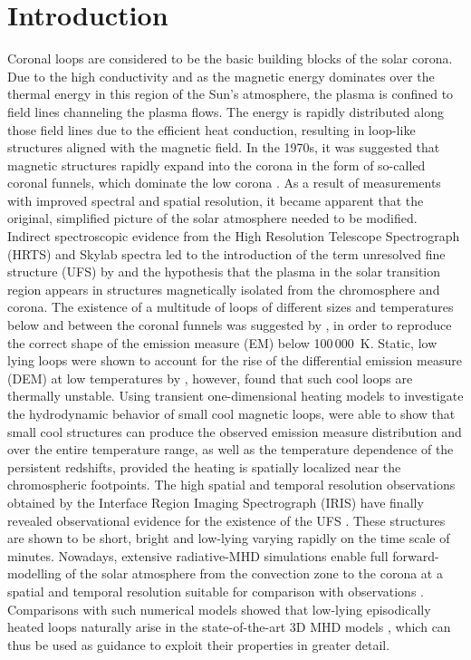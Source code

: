 \documentclass{aa}
\begin{document}
\section{Introduction}
Coronal loops are considered to be the basic building blocks of the solar corona. Due to the high conductivity and as the magnetic energy dominates over the thermal energy in this region of the Sun's atmosphere, the plasma is confined to field lines channeling the plasma flows. The energy is rapidly distributed along those field lines due to the efficient heat conduction, resulting in loop-like structures aligned with the magnetic field. %
In the 1970s, it was suggested that magnetic structures rapidly expand into the corona in the form of so-called coronal funnels, which dominate the low corona \citep{gabriel:1976}. 
As a result of measurements with improved spectral and spatial resolution, it became apparent that the original, simplified picture of the solar atmosphere needed to be modified. Indirect spectroscopic evidence from the High Resolution Telescope Spectrograph (HRTS) and Skylab spectra led to the introduction of the term unresolved fine structure (UFS) by \cite{feldman:1983} and the hypothesis that the plasma in the solar transition region appears in structures magnetically isolated from the chromosphere and corona. The existence of a multitude of loops of different sizes and temperatures below and between the coronal funnels was suggested by \cite{dowdy:1986}, in order to reproduce the correct shape of the emission measure (EM) below 100\,000~K. Static, low lying loops were shown to account for the rise of the differential emission measure (DEM) at low temperatures by \cite{antiochos+noci:1986}, however, \cite{cally+rob:1991} found that such cool loops are thermally unstable. Using transient one-dimensional heating models to investigate the hydrodynamic behavior of small cool magnetic loops, \cite{spadaro+al:2006} were able to show that small cool structures can produce the observed emission measure distribution and over the entire temperature range, as well as the temperature dependence of the persistent redshifts, provided the heating is spatially localized near the chromospheric footpoints. The high spatial and temporal resolution observations obtained by the Interface Region Imaging Spectrograph (IRIS) have finally revealed observational evidence for the existence of the UFS \citep{hansteen+al:2014}. These structures are shown to be short, bright and low-lying varying rapidly on the time scale of minutes. Nowadays, extensive radiative-MHD simulations \citep{gudiksen+al:2011} enable full forward-modelling of the solar atmosphere from the convection zone to the corona at a spatial and temporal resolution suitable for comparison with observations \citep{carlsson+al:2016}. Comparisons with such numerical models showed that low-lying episodically heated loops naturally arise in the state-of-the-art 3D MHD models \citep{gudiksen+al:2011,carlsson+al:2016}, which can thus be used as guidance to exploit their properties in greater detail.\\ 
\end{document}
